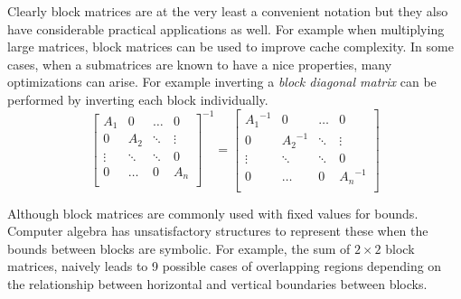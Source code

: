 Clearly block matrices are at the very least a convenient notation but they also have considerable practical applications as well.
For example when multiplying large matrices, block matrices can be used to improve cache complexity. \cite{lam1991cache}
In some cases, when a submatrices are known to have a nice properties, many optimizations can arise.
For example inverting a \emph{block diagonal matrix} can be performed by inverting each block individually. 
\begin{equation}
	\begin{bmatrix}
		A_1 & 0 & \ldots & 0 \\
		0 & A_2 & \ddots & \vdots \\
		\vdots & \ddots & \ddots & 0 \\
		0 & \ldots & 0 & A_n \\
	\end{bmatrix}^{-1}
	=
	\begin{bmatrix}
		{A_1}^{-1} & 0 & \ldots & 0 \\
		0 & {A_2}^{-1} & \ddots & \vdots \\
		\vdots & \ddots & \ddots & 0 \\
		0 & \ldots & 0 & {A_n}^{-1} \\
	\end{bmatrix}
\end{equation}

Although block matrices are commonly used with fixed values for bounds.
Computer algebra has unsatisfactory structures to represent these when the bounds between blocks are symbolic.
For example, the sum of $2 \times 2$ block matrices, naively leads to 9 possible cases of overlapping regions depending on
the relationship between horizontal and vertical boundaries between blocks.


